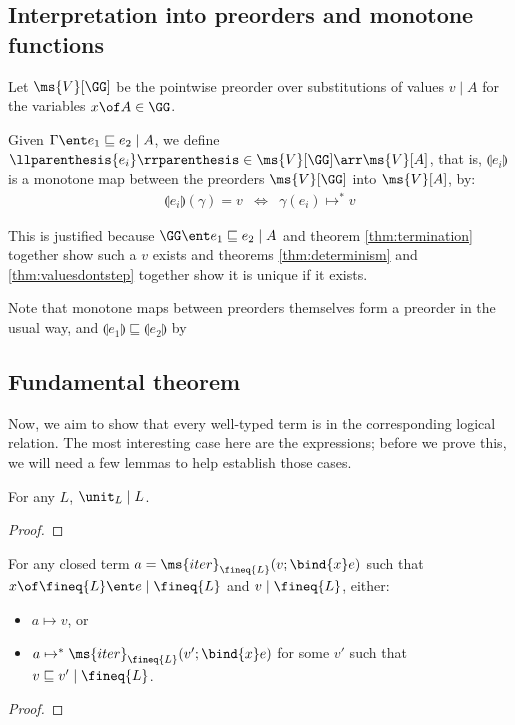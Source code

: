 \documentclass{article}
\newcommand{\ale}{\sqsubseteq}
\newcommand{\iter}[4]{\ms{iter}_{#1}({#2}; \bind{#3}#4)}
\newcommand{\step}{\mapsto}
\newcommand{\steps}{\step^*}
\newcommand{\lr}[2]{#2\mathrel{|}#1}
\newcommand{\lrcx}[3]{#1 \ent \lr{#2}{#3}}
\newcommand{\Val}[1]{\ms{V}[#1]}
\begin{document}

\subsection{Interpretation into preorders and monotone functions}

\newcommand{\I}[1]{\llparenthesis{#1}\rrparenthesis}

Let $\Val{\GG}$ be the pointwise preorder over substitutions of values
$\lr{A}{v}$ for the variables $x \of A \in \GG$.

Given $\lrcx{\Gamma}{A}{e_1 \ale e_2}$, we define $\I{e_i} \in \Val{\GG} \arr
\Val{A}$, that is, $\I{e_i}$ is a monotone map between the preorders $\Val{\GG}$
into $\Val{A}$, by:
\[\begin{array}{rcll}
  \I{e_i}(\gamma) = v &\iff& \gamma(e_i) \steps v
\end{array}\]

This is justified because $\lrcx{\GG}{A}{e_1 \ale e_2}$ and theorem
\ref{thm:termination} together show such a $v$ exists and theorems
\ref{thm:determinism} and \ref{thm:valuesdontstep} together show it is unique if
it exists.

Note that monotone maps between preorders themselves form a preorder in the
usual way, and $\I{e_1} \ale \I{e_2}$ by 


\subsection{Fundamental theorem}

Now, we aim to show that every well-typed term is in the corresponding logical
relation. The most interesting case here are the  expressions; before we
prove this, we will need a few lemmas to help establish those cases.

\begin{lemma}
  For any $L$, $\lr{L}{\unit_L}$.
\end{lemma}
\begin{proof}
  \TODO
\end{proof}

\begin{lemma}\label{thm:iterstep}
  For any closed term $a = \iter{\fineq{L}}{v}{x}{e}$ such that $\lrcx{x \of
    \fineq{L}}{\fineq{L}}{e}$ and $\lr{\fineq{L}}{v}$, either:
  \begin{itemize}
  \item $a \step v$, or
  \item $a \steps \iter{\fineq{L}}{v'}{x}{e}$ for some $v'$ such that
    $\lr{\fineq{L}}{v \ale v'}$.
  \end{itemize}
\end{lemma}
\begin{proof}
  \TODO
\end{proof}
\end{document}

